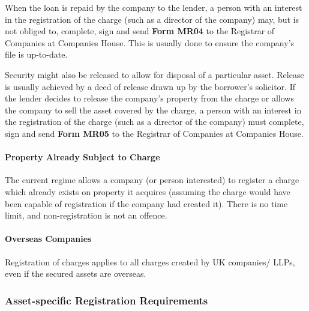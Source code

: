 \documentclass[
]{article}
\begin{document}
When the loan is repaid by the company to the lender, a person with an
interest in the registration of the charge (such as a director of the
company) may, but is not obliged to, complete, sign and send
\textbf{Form MR04} to the Registrar of Companies at Companies House.
This is usually done to ensure the company's file is up-to-date.

Security might also be released to allow for disposal of a particular
asset. Release is usually achieved by a deed of release drawn up by the
borrower's solicitor. If the lender decides to release the company's
property from the charge or allows the company to sell the asset covered
by the charge, a person with an interest in the registration of the
charge (such as a director of the company) must complete, sign and send
\textbf{Form MR05} to the Registrar of Companies at Companies House.

\hypertarget{property-already-subject-to-charge}{%
\paragraph{Property Already Subject to
Charge}\label{property-already-subject-to-charge}}

The current regime allows a company (or person interested) to register a
charge which already exists on property it acquires (assuming the charge
would have been capable of registration if the company had created it).
There is no time limit, and non-registration is not an offence.

\hypertarget{overseas-companies}{%
\paragraph{Overseas Companies}\label{overseas-companies}}

Registration of charges applies to all charges created by UK companies/
LLPs, even if the secured assets are overseas.

\hypertarget{asset-specific-registration-requirements}{%
\subsubsection{Asset-specific Registration
Requirements}\label{asset-specific-registration-requirements}}
\end{document}
